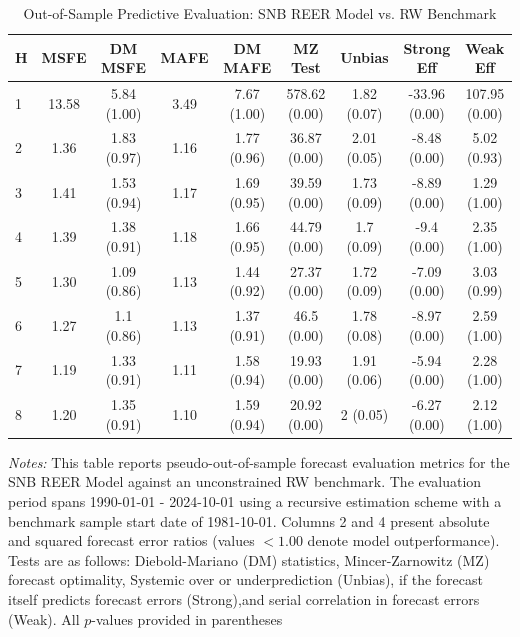 \begin{table}[htbp]
\centering
\caption{Out-of-Sample Predictive Evaluation: SNB REER Model vs. RW Benchmark}
\label{tab:snb_reer_model_evaluation}
\footnotesize
\begin{tabular}{l cccccccc}
\hline\hline
\rule{0pt}{3ex}
\textbf{H} & \textbf{MSFE} & \textbf{DM MSFE} & \textbf{MAFE} & \textbf{DM MAFE} & \textbf{MZ Test} & \textbf{Unbias} & \textbf{Strong Eff} & \textbf{Weak Eff} \\[0.5ex]
\hline
\rule{0pt}{2.5ex}
1 & 13.58 & 5.84 (1.00) & 3.49 & 7.67 (1.00) & 578.62 (0.00) & 1.82 (0.07) & -33.96 (0.00) & 107.95 (0.00) \\
2 & 1.36 & 1.83 (0.97) & 1.16 & 1.77 (0.96) & 36.87 (0.00) & 2.01 (0.05) & -8.48 (0.00) & 5.02 (0.93) \\
3 & 1.41 & 1.53 (0.94) & 1.17 & 1.69 (0.95) & 39.59 (0.00) & 1.73 (0.09) & -8.89 (0.00) & 1.29 (1.00) \\
4 & 1.39 & 1.38 (0.91) & 1.18 & 1.66 (0.95) & 44.79 (0.00) & 1.7 (0.09) & -9.4 (0.00) & 2.35 (1.00) \\
5 & 1.30 & 1.09 (0.86) & 1.13 & 1.44 (0.92) & 27.37 (0.00) & 1.72 (0.09) & -7.09 (0.00) & 3.03 (0.99) \\
6 & 1.27 & 1.1 (0.86) & 1.13 & 1.37 (0.91) & 46.5 (0.00) & 1.78 (0.08) & -8.97 (0.00) & 2.59 (1.00) \\
7 & 1.19 & 1.33 (0.91) & 1.11 & 1.58 (0.94) & 19.93 (0.00) & 1.91 (0.06) & -5.94 (0.00) & 2.28 (1.00) \\
8 & 1.20 & 1.35 (0.91) & 1.10 & 1.59 (0.94) & 20.92 (0.00) & 2 (0.05) & -6.27 (0.00) & 2.12 (1.00) \\
\hline\hline
\end{tabular}%
\par\smallskip
\parbox{\textwidth}{\scriptsize \textit{Notes:} This table reports pseudo-out-of-sample forecast evaluation metrics for the SNB REER Model against an unconstrained RW benchmark. The evaluation period spans 1990-01-01 - 2024-10-01 using a recursive estimation scheme with a benchmark sample start date of 1981-10-01. Columns 2 and 4 present absolute and squared forecast error ratios (values $< 1.00$ denote model outperformance). Tests are as follows: Diebold-Mariano (DM) statistics, Mincer-Zarnowitz (MZ) forecast optimality, Systemic over or underprediction (Unbias), if the forecast itself predicts forecast errors (Strong),and serial correlation in forecast errors (Weak). All $p$-values provided in parentheses}
\end{table}
